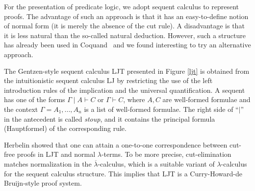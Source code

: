 \documentclass{svjour3}                     %
\newcommand{\Ga}{\Gamma}
\newcommand{\la}{\lambda}
\newcommand{\vd}{\vdash}
\begin{document}
For the presentation of predicate logic, we adopt sequent calculus to represent proofs. The advantage of such an approach is that it has an easy-to-define notion of normal form (it is merely the absence of the cut rule). 
A disadvantage is that it is less natural than the so-called natural deduction. However, such a structure has already been used in Coquand~\cite{cCoquand93} and we found interesting to try an alternative approach.

The Gentzen-style sequent calculus LJT presented in Figure \ref{ljt} is obtained from the intuitionistic sequent calculus LJ by restricting the use of the left introduction rules of the implication and the universal quantification. 
A sequent has one of the forms $\Ga\mid A \vd C$ or $\Ga \vd C$, where $A, C$ are well-formed formulae and the context $\Ga=A_1,...,A_n$ is a list of well-formed formulae. The right side of ``$\mid$'' in the antecedent is called {\em stoup}, and it contains the principal formula (Hauptformel) of the corresponding rule.

Herbelin \cite{Herbelin94,HerbelinPhD} showed that one can attain a one-to-one correspondence between cut-free proofs in LJT and normal $\la$-terms. 
To be more precise, cut-elimination matches normalization in the $\overline{\lambda}$-calculus, which is a suitable variant of $\lambda$-calculus for the sequent calculus structure. This implies that LJT is a Curry-Howard-de Bruijn-style proof system.
\end{document}
